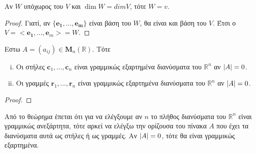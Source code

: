 \begin{cor}
    Αν $W$ υπόχωρος του $V$ και $ \dim W = dim V $, τότε $ W=v $.
\end{cor}
\begin{proof}
    Γιατί, αν $ \{ \mathbf{e_{1}}, \ldots, \mathbf{e_{m}}\}  $ είναι βάση του 
    $ W $, θα είναι και βάση του $V$. Έτσι ο 
    $ V = < \mathbf{e_{1}}, \ldots, \mathbf{e}_{m} > = W$.
\end{proof}

\begin{prop}
    Εστω $ A = (a_{ij}) \in \textbf{M}_{n}(\mathbb{R}) $. Τότε 
    \begin{enumerate}[i)]
        \item Οι στήλες $ \mathbf{c}_{1}, \ldots, \mathbf{c}_{n} $ είναι γραμμικώς 
            εξαρτημένα διανύσματα του $ \mathbb{R}^{n} $ αν $ \abs{A} = 0 $.
        \item Οι γραμμές $ \mathbf{r}_{1}, \ldots, \mathbf{r}_{n} $ είναι γραμμικώς 
            εξαρτημένα διανύσματα του $ \mathbb{R}^{n} $ αν $ \abs{A} = 0 $.
    \end{enumerate}
\end{prop}
\begin{proof}

\end{proof}

\begin{rem}
    Από το θεώρημα έπεται ότι για να ελέγξουμε αν $ n $ το πλήθος διανύσματα 
    του $ \mathbb{R}^{n} $ είναι γραμμικώς ανεξάρτητα, τότε αρκεί να ελέγξω την 
    ορίζουσα του πίνακα $A$ που έχει τα διανύσματα αυτά ως στήλες ή ως γραμμές. 
    Αν $ \abs{A} = 0 $, τότε θα είναι γραμμικώς εξαρτημένα.
\end{rem}


